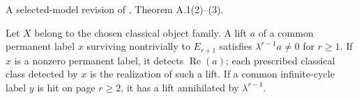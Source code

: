 \begin{proposition}
\label{sem:Literature:selected-realization}
A selected-model revision of \cite{BHS}, Theorem A.1(2)--(3).\par

Let $X$ belong to the chosen classical object family. A lift $a$ of a common permanent label $x$ surviving nontrivially to $E_{r+1}$ satisfies $\lambda^{r-1}a\ne0$ for $r\ge1$. If $x$ is a nonzero permanent label, it detects $\operatorname{Re}(a)$; each prescribed classical class detected by $x$ is the realization of such a lift. If a common infinite-cycle label $y$ is hit on page $r\ge2$, it has a lift annihilated by $\lambda^{r-1}$.
\end{proposition}

